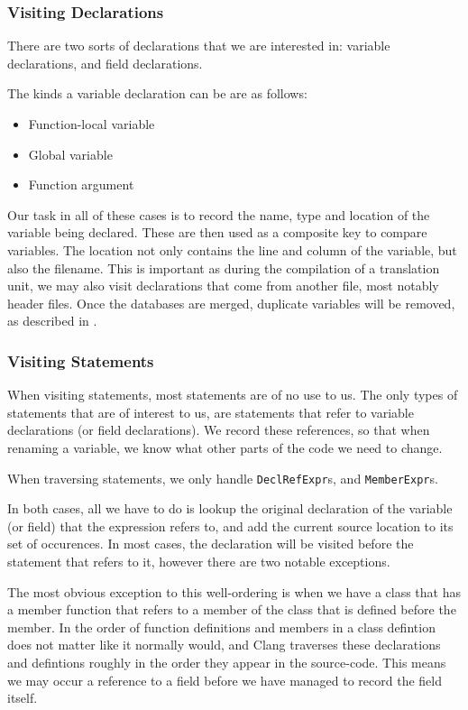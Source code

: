 \subsubsection{Visiting Declarations}
\label{sec:visitdecl}
There are two sorts of declarations that we are interested in: variable
declarations, and field declarations.

The kinds a variable declaration can be are as follows:
\begin{itemize}
	\item Function-local variable
	\item Global variable
	\item Function argument
\end{itemize}

Our task in all of these cases is to record the name, type and location of the
variable being declared. These are then used as a composite key to compare
variables. The location not only contains the line and column of the variable,
but also the filename. This is important as during the compilation of a
translation unit, we may also visit declarations that come from another file,
most notably header files. Once the databases are merged, duplicate variables
will be removed, as described in .

\subsubsection{Visiting Statements}
\label{sec:visitstmt}
When visiting statements, most statements are of no use to us. The only types
of statements that are of interest to us, are statements that refer to variable
declarations (or field declarations). We record these references, so that when
renaming a variable, we know what other parts of the code we need to change.

When traversing statements, we only handle \lstinline|DeclRefExpr|s, and
\lstinline|MemberExpr|s.

In both cases, all we have to do is lookup the original declaration of the
variable (or field) that the expression refers to, and add the current source
location to its set of occurences. In most cases, the declaration will be
visited before the statement that refers to it, however there are two notable
exceptions.

The most obvious exception to this well-ordering is when we have a class that
has a member function that refers to a member of the class that is defined
before the member. In \CC{} the order of function definitions and members in a
class defintion does not matter like it normally would, and Clang traverses
these declarations and defintions roughly in the order they appear in the
source-code. This means we may occur a reference to a field before we have
managed to record the field itself.

